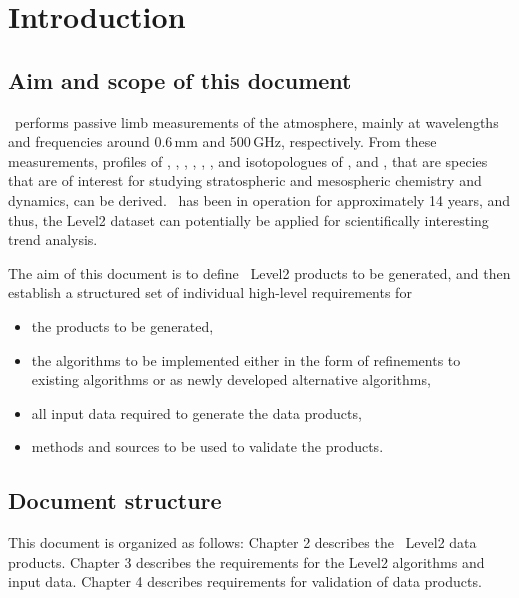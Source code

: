 \chapter{Introduction}
\label{chapter:introduction}


\setcounter{page}{1}


\section{Aim and scope of this document}
\label{sec:aim}
\smr\ performs passive limb measurements of the atmosphere,
mainly at wavelengths and frequencies around 0.6\,mm and 500\,GHz,
respectively.
From these measurements, profiles of 
, , , , 
, , and isotopologues of , and ,
that are species that are of interest for studying stratospheric and 
mesospheric chemistry and dynamics, can be derived. 
\smr\ has been in operation for approximately 14 years, and thus, the Level2
dataset can potentially be applied for scientifically interesting trend analysis.

The aim of this document is to define \smr\ Level2 products
to be generated, and then establish a structured set of 
individual high-level requirements for
\begin{itemize}
\item the products to be generated,
\item the algorithms to be implemented either in the form of refinements to existing
  algorithms or as newly developed alternative algorithms,
\item all input data required to generate the data products,
\item methods and sources to be used to validate the products.
\end{itemize}

\section{Document structure}

This document is organized as follows:
Chapter 2 describes the \smr\ Level2 data products.
Chapter 3 describes the requirements for
the \smr Level2 algorithms and input data.
Chapter 4 describes requirements for validation
of \smr data products.


